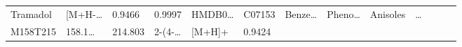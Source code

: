 \documentclass[
]{article}
\begin{document}
\begin{longtable}[]{@{}lllllllllllll@{}}
\begin{minipage}[t]{0.05\columnwidth}
Tramadol\strut
\end{minipage} & \begin{minipage}[t]{0.05\columnwidth}\raggedright
{[}M+H-\ldots{}\strut
\end{minipage} & \begin{minipage}[t]{0.07\columnwidth}\raggedright
0.9466\strut
\end{minipage} & \begin{minipage}[t]{0.07\columnwidth}\raggedright
0.9997\strut
\end{minipage} & \begin{minipage}[t]{0.05\columnwidth}\raggedright
HMDB0\ldots{}\strut
\end{minipage} & \begin{minipage}[t]{0.04\columnwidth}\raggedright
C07153\strut
\end{minipage} & \begin{minipage}[t]{0.05\columnwidth}\raggedright
Benze\ldots{}\strut
\end{minipage} & \begin{minipage}[t]{0.05\columnwidth}\raggedright
Pheno\ldots{}\strut
\end{minipage} & \begin{minipage}[t]{0.05\columnwidth}\raggedright
Anisoles\strut
\end{minipage} & \begin{minipage}[t]{0.02\columnwidth}\raggedright
\ldots{}\strut
\end{minipage}\tabularnewline
\begin{minipage}[t]{0.05\columnwidth}\raggedright
M158T215\strut
\end{minipage} & \begin{minipage}[t]{0.05\columnwidth}\raggedright
158.1\ldots{}\strut
\end{minipage} & \begin{minipage}[t]{0.05\columnwidth}\raggedright
214.803\strut
\end{minipage} & \begin{minipage}[t]{0.05\columnwidth}\raggedright
2-(4-\ldots{}\strut
\end{minipage} & \begin{minipage}[t]{0.05\columnwidth}\raggedright
{[}M+H{]}+\strut
\end{minipage} & \begin{minipage}[t]{0.07\columnwidth}\raggedright
0.9424\strut
\end{minipage} & \begin{minipage}[t]{0.07\columnwidth}\raggedright

\end{minipage}
\end{longtable}
\end{document}
